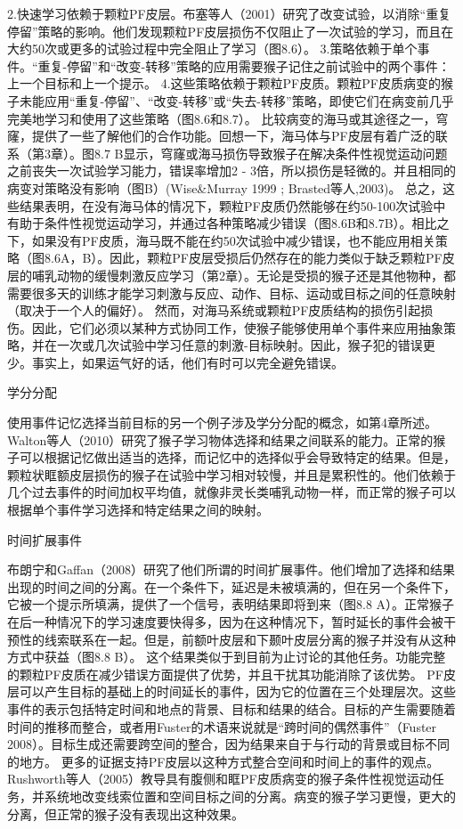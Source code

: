 2.快速学习依赖于颗粒PF皮层。布塞等人（2001）研究了改变试验，以消除“重复停留”策略的影响。他们发现颗粒PF皮层损伤不仅阻止了一次试验的学习，而且在大约50次或更多的试验过程中完全阻止了学习（图8.6）。
3.策略依赖于单个事件。“重复-停留”和“改变-转移”策略的应用需要猴子记住之前试验中的两个事件：上一个目标和上一个提示。
4.这些策略依赖于颗粒PF皮质。颗粒PF皮质病变的猴子未能应用“重复-停留”、“改变-转移”或“失去-转移”策略，即使它们在病变前几乎完美地学习和使用了这些策略（图8.6和8.7）。
比较病变的海马或其途径之一，穹窿，提供了一些了解他们的合作功能。回想一下，海马体与PF皮层有着广泛的联系（第3章）。图8.7 B显示，穹窿或海马损伤导致猴子在解决条件性视觉运动问题之前丧失一次试验学习能力，错误率增加2 - 3倍，所以损伤是轻微的。并且相同的病变对策略没有影响（图B）(Wise\&Murray 1999 ; Brasted等人,2003)。
总之，这些结果表明，在没有海马体的情况下，颗粒PF皮质仍然能够在约50-100次试验中有助于条件性视觉运动学习，并通过各种策略减少错误（图8.6B和8.7B）。相比之下，如果没有PF皮质，海马既不能在约50次试验中减少错误，也不能应用相关策略（图8.6A，B）。因此，颗粒PF皮层受损后仍然存在的能力类似于缺乏颗粒PF皮层的哺乳动物的缓慢刺激反应学习（第2章）。无论是受损的猴子还是其他物种，都需要很多天的训练才能学习刺激与反应、动作、目标、运动或目标之间的任意映射（取决于一个人的偏好）。
然而，对海马系统或颗粒PF皮质结构的损伤引起损伤。因此，它们必须以某种方式协同工作，使猴子能够使用单个事件来应用抽象策略，并在一次或几次试验中学习任意的刺激-目标映射。因此，猴子犯的错误更少。事实上，如果运气好的话，他们有时可以完全避免错误。

学分分配

使用事件记忆选择当前目标的另一个例子涉及学分分配的概念，如第4章所述。Walton等人（2010）研究了猴子学习物体选择和结果之间联系的能力。正常的猴子可以根据记忆做出适当的选择，而记忆中的选择似乎会导致特定的结果。但是，颗粒状眶额皮层损伤的猴子在试验中学习相对较慢，并且是累积性的。他们依赖于几个过去事件的时间加权平均值，就像非灵长类哺乳动物一样，而正常的猴子可以根据单个事件学习选择和特定结果之间的映射。

时间扩展事件

布朗宁和Gaffan（2008）研究了他们所谓的时间扩展事件。他们增加了选择和结果出现的时间之间的分离。在一个条件下，延迟是未被填满的，但在另一个条件下，它被一个提示所填满，提供了一个信号，表明结果即将到来（图8.8 A）。正常猴子在后一种情况下的学习速度要快得多，因为在这种情况下，暂时延长的事件会被干预性的线索联系在一起。但是，前额叶皮层和下颞叶皮层分离的猴子并没有从这种方式中获益（图8.8 B）。
这个结果类似于到目前为止讨论的其他任务。功能完整的颗粒PF皮质在减少错误方面提供了优势，并且干扰其功能消除了该优势。
PF皮层可以产生目标的基础上的时间延长的事件，因为它的位置在三个处理层次。这些事件的表示包括特定时间和地点的背景、目标和结果的结合。目标的产生需要随着时间的推移而整合，或者用Fuster的术语来说就是“跨时间的偶然事件”（Fuster 2008）。目标生成还需要跨空间的整合，因为结果来自于与行动的背景或目标不同的地方。
更多的证据支持PF皮层以这种方式整合空间和时间上的事件的观点。Rushworth等人（2005）教导具有腹侧和眶PF皮质病变的猴子条件性视觉运动任务，并系统地改变线索位置和空间目标之间的分离。病变的猴子学习更慢，更大的分离，但正常的猴子没有表现出这种效果。

